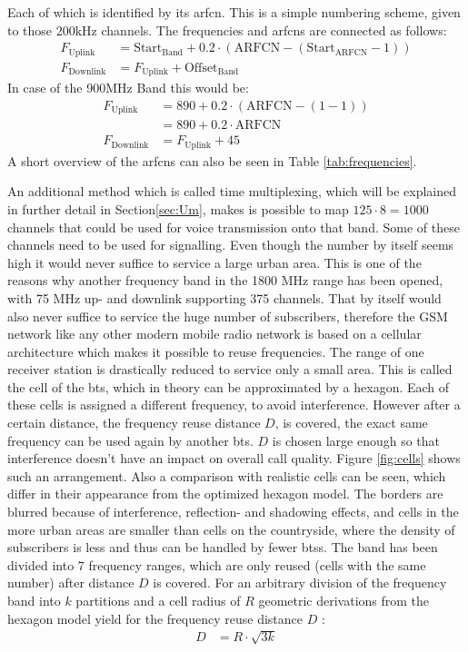 Each of which is identified by its \gls{arfcn}.
This is a simple numbering scheme, given to those 200kHz channels.
The frequencies and \glspl{arfcn} are connected as follows:
\begin{align}
F_\text{Uplink} 	&= \text{Start}_\text{Band} + 0.2 \cdot (\text{ARFCN} -(\text{Start}_\text{ARFCN} -1))\\
F_\text{Downlink}   &= F_\text{Uplink} + \text{Offset}_\text{Band}
\end{align}
In case of the 900MHz Band this would be:
\begin{align}
F_\text{Uplink}		&=890 + 0.2 \cdot (\text{ARFCN} - (1-1))\\
					&=890 + 0.2 \cdot \text{ARFCN}\\
F_\text{Downlink}	&=F_\text{Uplink} + 45
\end{align}
A short overview of the \glspl{arfcn} can also be seen in Table \ref{tab:frequencies}.

An additional method which is called time multiplexing, which will be explained in further detail in Section\ref{sec:Um}, makes is possible to map $125 \cdot 8 = 1000$ channels that could be used for voice transmission onto that band.
Some of these channels need to be used for signalling.
Even though the number by itself seems high it would never suffice to service a large urban area.
This is one of the reasons why another frequency band in the 1800 MHz range has been opened, with 75 MHz up- and downlink supporting 375 channels.
That by itself would also never suffice to service the huge number of subscribers, therefore the GSM network like any other modern mobile radio network is based on a cellular architecture which makes it possible to reuse frequencies.
The range of one receiver station is drastically reduced to service only a small area.
This is called the cell of the \gls{bts}, which in theory can be approximated by a hexagon.
Each of these cells is assigned a different frequency, to avoid interference.
However after a certain distance, the frequency reuse distance $D$, is covered, the exact same frequency can be used again by another \gls{bts}.
$D$ is chosen large enough so that interference doesn't have an impact on overall call quality.
Figure \ref{fig:cells} shows such an arrangement.
Also a comparison with realistic cells can be seen, which differ in their appearance from the optimized hexagon model.
The borders are blurred because of interference, reflection- and shadowing effects, and cells in the more urban areas are smaller than cells on the countryside, where the density of subscribers is less and thus can be handled by fewer \glspl{bts}.
The band has been divided into 7 frequency ranges, which are only reused (cells with the same number) after distance $D$ is covered.
For an arbitrary division of the frequency band into $k$ partitions and a cell radius of $R$ geometric derivations from the hexagon model yield for the frequency reuse distance $D$ \cite{GSM2009}:
\begin{align}
D	&=R\cdot\sqrt{3k}
\end{align}

